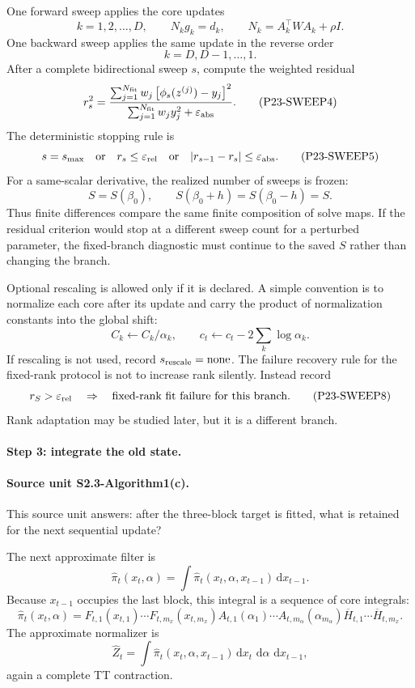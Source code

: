 \documentclass[11pt]{article}
\newcommand{\dd}{\,\mathrm d}
\begin{document}
One forward sweep applies the core updates
\[
    k=1,2,\ldots,D,
    \qquad
    N_k g_k=d_k,
    \qquad
    N_k=A_k^\top W A_k+\rho I.
    \tag{P23-SWEEP2}
\]
One backward sweep applies the same update in the reverse order
\[
    k=D,D-1,\ldots,1.
    \tag{P23-SWEEP3}
\]
After a complete bidirectional sweep \(s\), compute the weighted residual
\[
    r_s^2
    =
    \frac{\sum_{j=1}^{N_{\rm fit}}w_j
    \left[\phi_s(z^{(j)})-y_j\right]^2}
    {\sum_{j=1}^{N_{\rm fit}}w_j y_j^2+\varepsilon_{\rm abs}}.
    \tag{P23-SWEEP4}
\]
The deterministic stopping rule is
\[
    s=s_{\max}\quad\text{or}\quad
    r_s\le \varepsilon_{\rm rel}
    \quad\text{or}\quad
    |r_{s-1}-r_s|\le \varepsilon_{\rm abs}.
    \tag{P23-SWEEP5}
\]
For a same-scalar derivative, the realized number of sweeps is frozen:
\[
    S=S(\beta_0),
    \qquad
    S(\beta_0+h)=S(\beta_0-h)=S.
    \tag{P23-SWEEP6}
\]
Thus finite differences compare the same finite composition of solve maps.
If the residual criterion would stop at a different sweep count for a
perturbed parameter, the fixed-branch diagnostic must continue to the saved
\(S\) rather than changing the branch.

Optional rescaling is allowed only if it is declared.  A simple convention is
to normalize each core after its update and carry the product of normalization
constants into the global shift:
\[
    C_k\leftarrow C_k/\alpha_k,
    \qquad
    c_t\leftarrow c_t-2\sum_k\log \alpha_k.
    \tag{P23-SWEEP7}
\]
If rescaling is not used, record \(s_{\rm rescale}=\text{none}\).  The failure
recovery rule for the fixed-rank protocol is not to increase rank silently.
Instead record
\[
    r_S>\varepsilon_{\rm rel}
    \quad\Rightarrow\quad
    \text{fixed-rank fit failure for this branch}.
    \tag{P23-SWEEP8}
\]
Rank adaptation may be studied later, but it is a different branch.

\paragraph{Step 3: integrate the old state.}
\paragraph{Source unit S2.3-Algorithm1(c).}
This source unit answers: after the three-block target is fitted, what is
retained for the next sequential update?

The next approximate filter is
\[
    \widehat\pi_t(x_t,\alpha)
    =
    \int \widehat\pi_t(x_t,\alpha,x_{t-1})\dd x_{t-1}.
    \tag{A1-3}
\]
Because \(x_{t-1}\) occupies the last block, this integral is a sequence of core
integrals:
\[
    \widehat\pi_t(x_t,\alpha)
    =
    F_{t,1}(x_{t,1})\cdots F_{t,m_x}(x_{t,m_x})
    A_{t,1}(\alpha_1)\cdots A_{t,m_\alpha}(\alpha_{m_\alpha})
    \overline H_{t,1}\cdots \overline H_{t,m_x}.
    \tag{A1-4}
\]
The approximate normalizer is
\[
    \widehat Z_t
    =
    \int \widehat\pi_t(x_t,\alpha,x_{t-1})
    \dd x_t\,\dd\alpha\,\dd x_{t-1},
    \tag{A1-5}
\]
again a complete TT contraction.
\end{document}
